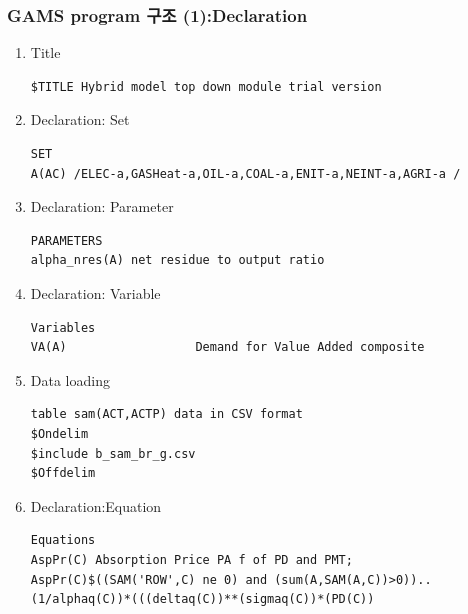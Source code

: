 \documentclass[10pt,compress,slidetop,%
			   hyperref={unicode},xcolor={svgnames},%
			   t]{beamer}
\begin{document}
\begin{frame}[fragile]
\frametitle{GAMS program 구조 (1):Declaration}
\begin{scriptsize}
\begin{enumerate}
\item{Title}
\begin{verbatim}
$TITLE Hybrid model top down module trial version
\end{verbatim}
\item{Declaration: Set}

\begin{verbatim}
SET
A(AC) /ELEC-a,GASHeat-a,OIL-a,COAL-a,ENIT-a,NEINT-a,AGRI-a /
\end{verbatim}
\item{Declaration: Parameter}
\begin{verbatim}
PARAMETERS
alpha_nres(A) net residue to output ratio
\end{verbatim}
\item{Declaration: Variable}
\begin{verbatim}
Variables
VA(A)                  Demand for Value Added composite
\end{verbatim}
\item{Data loading}
\begin{verbatim}
table sam(ACT,ACTP) data in CSV format
$Ondelim
$include b_sam_br_g.csv
$Offdelim
\end{verbatim}

\item{Declaration:Equation}
\begin{verbatim}
Equations
AspPr(C) Absorption Price PA f of PD and PMT;
AspPr(C)$((SAM('ROW',C) ne 0) and (sum(A,SAM(A,C))>0))..
(1/alphaq(C))*(((deltaq(C))**(sigmaq(C))*(PD(C))
\end{verbatim}
\end{enumerate}
\end{scriptsize}
\end{frame}
\end{document}
